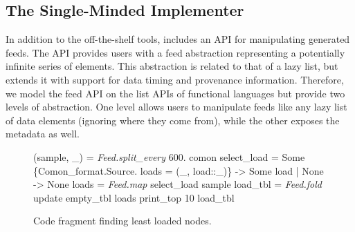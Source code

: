 

\subsection{The Single-Minded Implementer}

In addition to the off-the-shelf tools, \padsd{} includes an API for
manipulating generated feeds. The API provides 
users with a feed abstraction representing a potentially infinite
series of elements. This abstraction is related to that of a lazy
list, but extends it with support for data timing and provenance
information. Therefore, we model the feed API on the
list APIs of functional languages
but provide two levels of abstraction. One level allows users to
manipulate feeds like any lazy list of data elements (ignoring
where they come from), while the other exposes the metadata as well. 



\begin{figure}[tb]
\begin{codebox}
 (sample, \_) = \textit{Feed.split_every} 600. comon 
 select_load = 
    Some \{Comon_format.Source.
          loads = (_, load::_)\} -> Some load
  | None -> None 
 loads    = \textit{Feed.map} select_load sample 
 load_tbl = \textit{Feed.fold} update empty_tbl loads 
  print_top 10 load_tbl
\end{codebox}
  \caption{Code fragment finding least loaded \planetlab nodes.}
\label{fig:sample-loads}
\end{figure}



